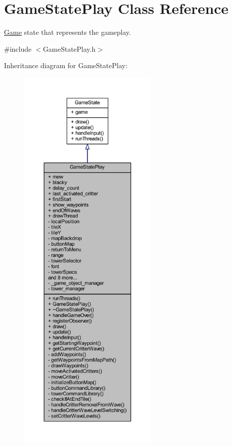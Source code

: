 \hypertarget{class_game_state_play}{\section{Game\+State\+Play Class Reference}
\label{class_game_state_play}
}


\hyperlink{class_game}{Game} state that represents the gameplay.  




{\ttfamily \#include $<$Game\+State\+Play.\+h$>$}



Inheritance diagram for Game\+State\+Play\+:
\nopagebreak
\begin{figure}[H]
\begin{center}
\leavevmode
\includegraphics[height=550pt]{class_game_state_play__inherit__graph}
\end{center}
\end{figure}


